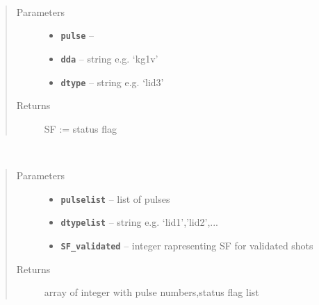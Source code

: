 \documentclass[letterpaper,10pt,english]{sphinxmanual}
\begin{document}
\begin{fulllineitems}
\label{status_flag:status_flag.GetSF}~\begin{quote}\begin{description}
\item[{Parameters}] \leavevmode\begin{itemize}
\item {} 
\textbf{\texttt{pulse}} -- 

\item {} 
\textbf{\texttt{dda}} -- string e.g. `kg1v'

\item {} 
\textbf{\texttt{dtype}} -- string e.g. `lid3'

\end{itemize}

\item[{Returns}] \leavevmode
SF := status flag

\end{description}\end{quote}

\end{fulllineitems}


\begin{fulllineitems}
\label{status_flag:status_flag.Getnonvalidatedpulses}~\begin{quote}\begin{description}
\item[{Parameters}] \leavevmode\begin{itemize}
\item {} 
\textbf{\texttt{pulselist}} -- list of pulses

\item {} 
\textbf{\texttt{dtypelist}} -- string e.g. `lid1','lid2',...

\item {} 
\textbf{\texttt{SF\_validated}} -- integer rapresenting SF for validated shots

\end{itemize}

\item[{Returns}] \leavevmode
array of integer with pulse numbers,status flag list

\end{description}\end{quote}

\end{fulllineitems}
\end{document}
